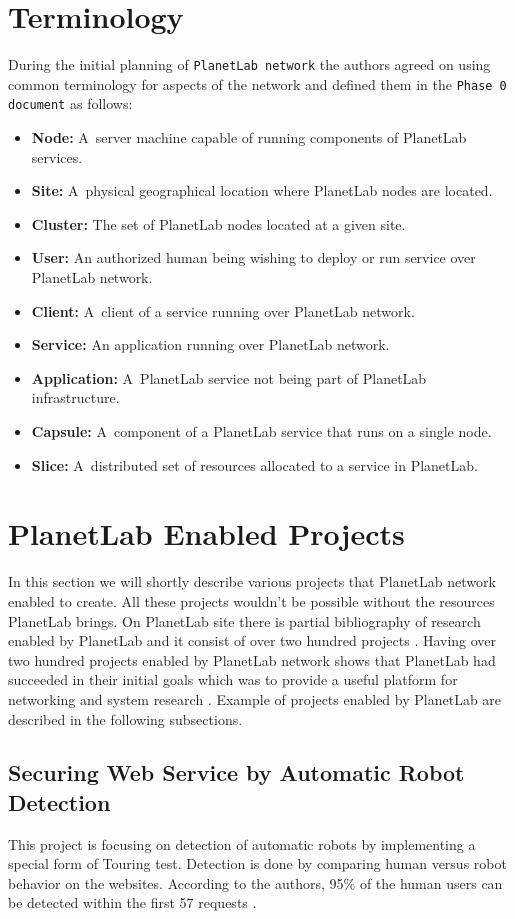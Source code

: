 \section{Terminology}
During the initial planning of \texttt{PlanetLab network} the authors agreed on using common terminology for aspects of the network and defined them in the \texttt{Phase 0 document} \cite{Roscoe_PDN-02-002} as follows:
\begin{itemize}
	\item \textbf{Node:} A~server machine capable of running components of PlanetLab services.
	\item \textbf{Site:} A~physical geographical location where PlanetLab nodes are located.
	\item \textbf{Cluster:} The set of PlanetLab nodes located at a given site.
	\item \textbf{User:} An authorized human being wishing to deploy or run service over PlanetLab network.
	\item \textbf{Client:} A~client of a service running over PlanetLab network.
	\item \textbf{Service:} An application running over PlanetLab network.
	\item \textbf{Application:} A~PlanetLab service not being part of PlanetLab infrastructure. 
	\item \textbf{Capsule:} A~component of a PlanetLab service that runs on a single node.
	\item \textbf{Slice:} A~distributed set of resources allocated to a service in PlanetLab.
\end{itemize}
\section{PlanetLab Enabled Projects}
In this section we will shortly describe various projects that PlanetLab network enabled to create. All these projects wouldn't be possible without the resources PlanetLab brings. On PlanetLab site there is partial bibliography of research enabled by PlanetLab and it consist of over two hundred projects \cite{planetlabmain}. Having over two hundred projects enabled by PlanetLab network shows that PlanetLab had succeeded in their initial goals which was to provide a useful platform for networking and system research \cite{Roscoe_PDN-02-002}. Example of projects enabled by PlanetLab are described in the following subsections.
\subsection{Securing Web Service by Automatic Robot Detection}
This project is focusing on detection of automatic robots by implementing a special form of Touring test. Detection is done by comparing human versus robot behavior on the websites. According to the authors, 95\% of the human users can be detected within the first 57 requests \cite{Park:2006:SWS:1267359.1267382}.
